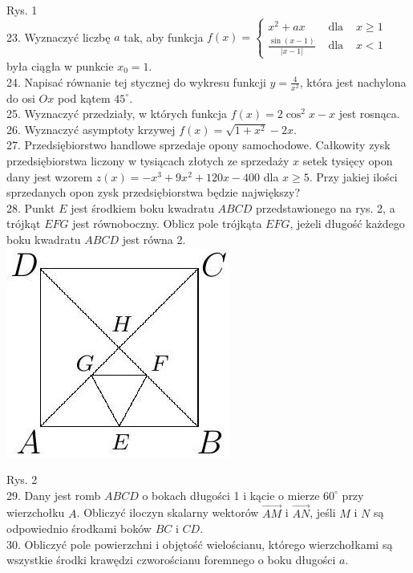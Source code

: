 \documentclass[10pt]{article}
\begin{document}
Rys. 1\\
23. Wyznaczyć liczbę \(a\) tak, aby funkcja \(f(x)=\left\{\begin{array}{lll}x^{2}+a x & \text { dla } & x \geqslant 1 \\ \frac{\sin (x-1)}{|x-1|} & \text { dla } & x<1\end{array}\right.\) była ciągła w punkcie \(x_{0}=1\).\\
24. Napisać równanie tej stycznej do wykresu funkcji \(y=\frac{4}{x^{2}}\), która jest nachylona do osi \(O x\) pod kątem \(45^{\circ}\).\\
25. Wyznaczyć przedziały, w których funkcja \(f(x)=2 \cos ^{2} x-x\) jest rosnąca.\\
26. Wyznaczyć asymptoty krzywej \(f(x)=\sqrt{1+x^{2}}-2 x\).\\
27. Przedsiębiorstwo handlowe sprzedaje opony samochodowe. Całkowity zysk przedsiębiorstwa liczony w tysiącach złotych ze sprzedaży \(x\) setek tysięcy opon dany jest wzorem \(z(x)=-x^{3}+9 x^{2}+120 x-400\) dla \(x \geqslant 5\). Przy jakiej ilości sprzedanych opon zysk przedsiębiorstwa będzie największy?\\
28. Punkt \(E\) jest środkiem boku kwadratu \(A B C D\) przedstawionego na rys. 2, a trójkąt \(E F G\) jest równoboczny. Oblicz pole trójkąta \(E F G\), jeżeli długość każdego boku kwadratu \(A B C D\) jest równa 2.\\
\includegraphics[max width=\textwidth, center]{2024_11_21_17fc964787b720e2b056g-2(1)}

Rys. 2\\
29. Dany jest romb \(A B C D\) o bokach długości 1 i kącie o mierze \(60^{\circ}\) przy wierzchołku \(A\). Obliczyć iloczyn skalarny wektorów \(\overrightarrow{A M}\) i \(\overrightarrow{A N}\), jeśli \(M\) i \(N\) są odpowiednio środkami boków \(B C\) i \(C D\).\\
30. Obliczyć pole powierzchni i objętość wielościanu, którego wierzchołkami są wszystkie środki krawędzi czworościanu foremnego o boku długości \(a\).
\end{document}
